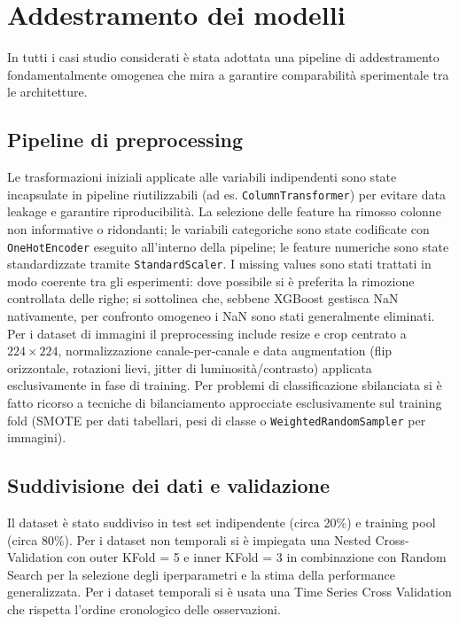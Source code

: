 \documentclass[a4paper,12pt]{report}
\begin{document}
	\section{Addestramento dei modelli}
	
	In tutti i casi studio considerati è stata adottata una pipeline di addestramento fondamentalmente omogenea che mira a garantire comparabilità sperimentale tra le architetture.
	
	\subsection{Pipeline di preprocessing}
	Le trasformazioni iniziali applicate alle variabili indipendenti sono state incapsulate in pipeline riutilizzabili (ad es. \texttt{ColumnTransformer}) per evitare data leakage e garantire riproducibilità. La selezione delle feature ha rimosso colonne non informative o ridondanti; le variabili categoriche sono state codificate con \texttt{OneHotEncoder} eseguito all'interno della pipeline; le feature numeriche sono state standardizzate tramite \texttt{StandardScaler}. I missing values sono stati trattati in modo coerente tra gli esperimenti: dove possibile si è preferita la rimozione controllata delle righe; si sottolinea che, sebbene XGBoost gestisca NaN nativamente, per confronto omogeneo i NaN sono stati generalmente eliminati. Per i dataset di immagini il preprocessing include resize e crop centrato a $224\times224$, normalizzazione canale-per-canale e data augmentation (flip orizzontale, rotazioni lievi, jitter di luminosità/contrasto) applicata esclusivamente in fase di training. Per problemi di classificazione sbilanciata si è fatto ricorso a tecniche di bilanciamento approcciate esclusivamente sul training fold (SMOTE per dati tabellari, pesi di classe o \texttt{WeightedRandomSampler} per immagini).
	
	\subsection{Suddivisione dei dati e validazione}
	Il dataset è stato suddiviso in test set indipendente (circa 20\%) e training pool (circa 80\%). Per i dataset non temporali si è impiegata una Nested Cross-Validation con outer KFold = 5 e inner KFold = 3 in combinazione con Random Search per la selezione degli iperparametri e la stima della performance generalizzata. Per i dataset temporali si è usata una Time Series Cross Validation che rispetta l'ordine cronologico delle osservazioni.
	
\end{document}

